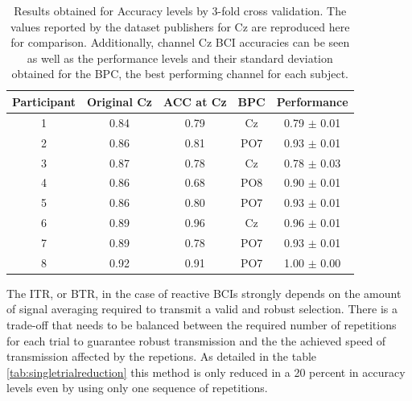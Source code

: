 \documentclass[entropy,article,submit,moreauthors,pdftex,10pt,a4paper]{mdpi}
\begin{document}

\begin{table}[H]
\caption{Results obtained for Accuracy levels by 3-fold cross validation. The values reported by the dataset publishers for Cz are reproduced here for comparison. Additionally, channel Cz BCI accuracies can be seen as well as the performance levels and their standard deviation obtained for the BPC, the best performing channel for each subject.}
\centering
\begin{tabular}{ccccc}
\toprule
\textbf{Participant}	& \textbf{Original Cz}	& \textbf{ACC at Cz}	& \textbf{BPC}	& \textbf{Performance}\\
\midrule
1     &   0.84 &   0.79 & Cz  &   0.79 $\pm$ 0.01 \\
2     &   0.86 &   0.81 & PO7 &   0.93 $\pm$ 0.01 \\
3     &   0.87 &   0.78 & Cz  &   0.78 $\pm$ 0.03 \\
4     &   0.86 &   0.68 & PO8 &   0.90 $\pm$ 0.01 \\
5     &   0.86 &   0.80 & PO7 &   0.93 $\pm$ 0.01 \\
6     &   0.89 &   0.96 & Cz  &   0.96 $\pm$ 0.01 \\
7     &   0.89 &   0.78 & PO7 &   0.93 $\pm$ 0.01 \\
8     &   0.92 &   0.91 & PO7 &   1.00 $\pm$ 0.00 \\
\bottomrule
\end{tabular}
\label{tab:results}
\end{table}

The ITR, or BTR, in the case of reactive BCIs \citep{WolpawJonathanR2012} strongly depends on the amount of signal averaging required to transmit a valid and robust selection.  There is a trade-off that needs to be balanced between the required number of repetitions for each trial to guarantee robust transmission and the the achieved speed of transmission affected by the repetions.  As detailed in the table \ref{tab:singletrialreduction} this method is only reduced in a 20 percent in accuracy levels even by using only one sequence of repetitions.
\end{document}
